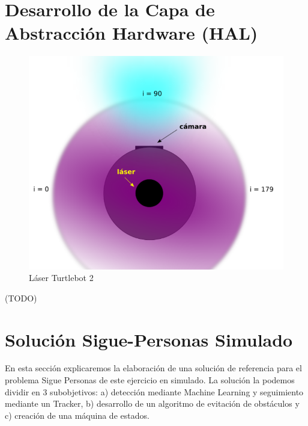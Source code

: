 \section{Desarrollo de la Capa de Abstracción Hardware (HAL)}
\label{sec:turtlebot2_hal_simulado}

\begin{figure} [H]
  \begin{center}
    \includegraphics[width=15cm]{imagenes/vista-planta-turtlebot2.png}
  \end{center}
  \caption[Láser Turtlebot 2]{Láser Turtlebot 2}
  \label{fig:vista_planta_turtlebot2}
\end{figure}
(TODO)




\section{Solución Sigue-Personas Simulado}
\label{sec:sigue_personas_simulado}

En esta sección explicaremos la elaboración de una solución de referencia para el problema Sigue Personas de este ejercicio en simulado. La solución la podemos dividir en 3 subobjetivos: a) detección mediante Machine Learning y seguimiento mediante un Tracker, b) desarrollo de un algoritmo de evitación de obstáculos y c) creación de una máquina de estados.


